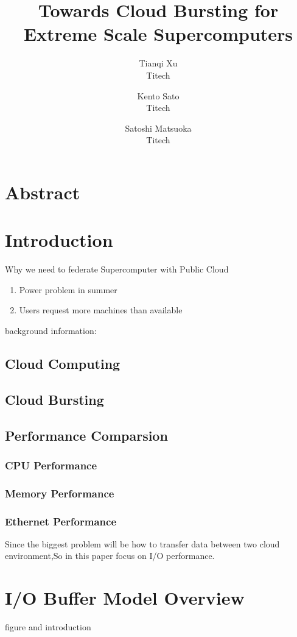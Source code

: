 \documentclass{article}
\begin{document}
	\title{Towards Cloud Bursting for Extreme Scale Supercomputers}
	\author{Tianqi Xu \\ Titech \and Kento Sato \\Titech \and Satoshi Matsuoka\\Titech}
	\date{}
\maketitle


\section*{Abstract}


\section{Introduction}
Why we need to federate Supercomputer with Public Cloud
	\begin{enumerate}
		\item Power problem in summer
		\item Users request more machines than available
	\end{enumerate}
background information:
	\subsection{Cloud Computing}
	\subsection{Cloud Bursting}
	\subsection{Performance Comparsion}
		\subsubsection{CPU Performance}
		\subsubsection{Memory Performance}
		\subsubsection{Ethernet Performance}
Since the biggest problem will be how to transfer data between two cloud environment,So in this paper focus on I/O performance.


\section{I/O Buffer Model Overview}
figure and introduction
\end{document}

